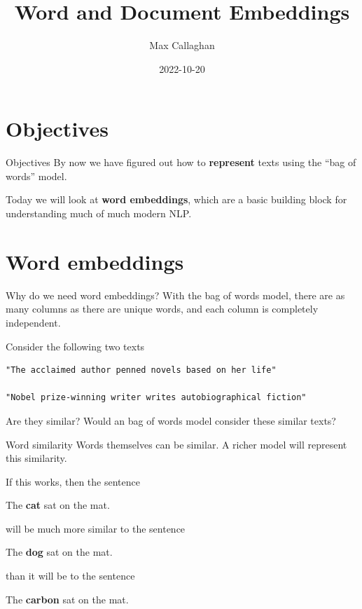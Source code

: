 \documentclass[
  10pt,
  ignorenonframetext,
  aspectratio=169]{beamer}
\title{Word and Document Embeddings}
\author{Max Callaghan}
\date{2022-10-20}
\begin{document}
\frame{\titlepage}

\hypertarget{objectives}{%
\section{Objectives}\label{objectives}}

\begin{frame}{Objectives}
\protect\hypertarget{objectives-1}{}
By now we have figured out how to \textbf{represent} texts using the
``bag of words'' model.

Today we will look at \textbf{word embeddings}, which are a basic
building block for understanding much of much modern NLP.
\end{frame}

\hypertarget{word-embeddings}{%
\section{Word embeddings}\label{word-embeddings}}

\begin{frame}[fragile]{Why do we need word embeddings?}
\protect\hypertarget{why-do-we-need-word-embeddings}{}
With the bag of words model, there are as many columns as there are
unique words, and each column is completely independent.

Consider the following two texts

\begin{verbatim}
"The acclaimed author penned novels based on her life"

"Nobel prize-winning writer writes autobiographical fiction"
\end{verbatim}

Are they similar? Would an bag of words model consider these similar
texts?
\end{frame}

\begin{frame}{Word similarity}
\protect\hypertarget{word-similarity}{}
Words themselves can be similar. A richer model will represent this
similarity.

If this works, then the sentence

The \textbf{cat} sat on the mat.

will be much more similar to the sentence

The \textbf{dog} sat on the mat.

than it will be to the sentence

The \textbf{carbon} sat on the mat.
\end{frame}
\end{document}

